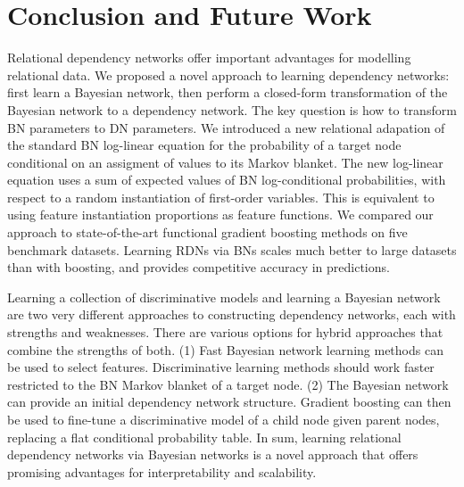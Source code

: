 \documentclass[runningheads,a4paper]{llncs}
\begin{document}
\section{Conclusion and Future Work} 
\label{sec:conclusion}
Relational dependency networks offer important advantages for modelling relational data. We proposed a novel approach to learning dependency networks: first learn a Bayesian network, then perform a closed-form transformation of the Bayesian network to a dependency network. The key question is how to transform BN parameters to DN parameters. We introduced a new relational adapation of the standard BN log-linear equation for the probability of a target node conditional on an assigment of values to its Markov blanket. The new log-linear equation uses a sum of expected values of BN log-conditional probabilities, with respect to a random instantiation of first-order variables. This is equivalent to using feature instantiation proportions as feature functions. We compared our approach to state-of-the-art functional gradient boosting methods  on five benchmark datasets. Learning RDNs via BNs scales much better to large datasets than with boosting, and provides competitive accuracy in predictions.

Learning a collection of discriminative models and learning a Bayesian network are two very different approaches to constructing dependency networks, each with strengths and weaknesses. There are various options for hybrid approaches that combine the strengths of both. (1) Fast Bayesian network learning methods can be used to select features. Discriminative learning methods should work  faster restricted to the BN Markov blanket of a target node. (2) The Bayesian network can provide an initial dependency network structure. Gradient boosting can then be used to fine-tune a discriminative model of a child node given parent nodes, replacing a flat conditional probability table. In sum, learning relational dependency networks via Bayesian networks is a novel approach that offers promising advantages for  interpretability and scalability.




\end{document}
